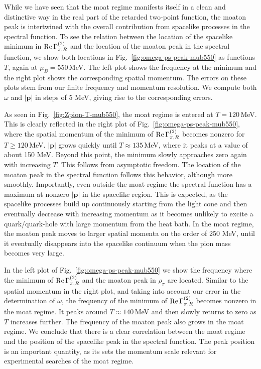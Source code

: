 \documentclass[reprint,english,superscriptaddress,preprintnumbers,amsmath,amssymb,aps,prd,nofootinbib]{revtex4-2}
\newcommand{\bs}[1]{\boldsymbol{#1}}
\def\Fig#1{Fig.~\ref{#1}}
\begin{document}
While we have seen that the moat regime manifests itself in a clean and distinctive way in the real part of the retarded two-point function, the moaton peak is intertwined with the overall contribution from spacelike processes in the spectral function. To see the relation between the location of the spacelike minimum in ${\rm Re}\,\Gamma_{\pi,R}^{(2)}$ and the location of the moaton peak in the spectral function, we show both locations in \Fig{fig:omega-ps-peak-mub550} as functions $T$, again at $\mu_B = 550$\,MeV. The left plot shows the frequency at the minimum and the right plot shows the corresponding spatial momentum. The errors on these plots stem from our finite frequency and momentum resolution. We compute both $\omega$ and $|\bs{p}|$ in steps of 5 MeV, giving rise to the corresponding errors. 

As seen in \Fig{fig:Zpion-T-mub550}, the moat regime is entered at $T= 120$\,MeV. This is clearly reflected in the right plot of \Fig{fig:omega-ps-peak-mub550}, where the spatial momentum of the minimum of ${\rm Re}\,\Gamma_{\pi,R}^{(2)}$ becomes nonzero for $T\geq 120$\,MeV. $|\bs{p}|$ grows quickly until $T\approx 135$\,MeV, where it peaks at a value of about 150 MeV. Beyond this point, the minimum slowly approaches zero again with increasing $T$. This follows from asymptotic freedom. The location of the moaton peak in the spectral function follows this behavior, although more smoothly. Importantly, even outside the moat regime the spectral function has a maximum at nonzero $|\bs{p}|$ in the spacelike region. This is expected, as the spacelike processes build up continuously starting from the light cone and then eventually decrease with increasing momentum as it becomes unlikely to excite a quark/quark-hole with large momentum from the heat bath. In the moat regime, the moaton peak moves to larger spatial momenta on the order of 250 MeV, until it eventually disappears into the spacelike continuum when the pion mass becomes very large.   

In the left plot of \Fig{fig:omega-ps-peak-mub550} we show the frequency where the minimum of ${\rm Re}\,\Gamma_{\pi,R}^{(2)}$ and the moaton peak in $\rho_\pi$ are located. Similar to the spatial momentum in the right plot, and taking into account our error in the determination of $\omega$, the frequency of the minimum of ${\rm Re}\,\Gamma_{\pi,R}^{(2)}$ becomes nonzero in the moat regime. It peaks around $T \approx 140$\,MeV and then slowly returns to zero as $T$ increases further. The frequency of the moaton peak also grows in the moat regime. We conclude that there is a clear correlation between the moat regime and the position of the spacelike peak in the spectral function. The peak position is an important quantity, as its sets the momentum scale relevant for experimental searches of the moat regime.
\end{document}
